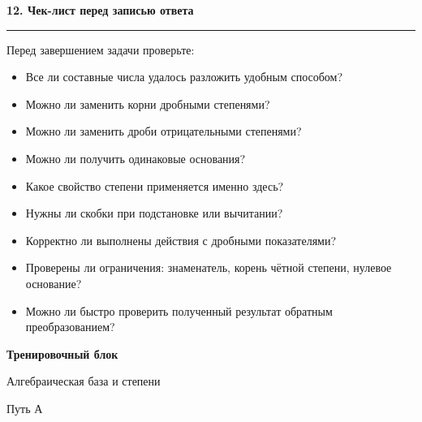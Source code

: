 \documentclass[a4paper,12pt]{article}
\newcommand{\MainSection}[1]{%
  \vspace{0.7em}
  {\Large\bfseries\color{darkaccent}#1\par}
  \vspace{0.25em}
  {\color{accent}\rule{\linewidth}{0.6pt}}
  \vspace{0.5em}
}
\begin{document}

\MainSection{12. Чек-лист перед записью ответа}

Перед завершением задачи проверьте:

\begin{itemize}

\item
Все ли составные числа удалось разложить удобным способом?

\item
Можно ли заменить корни дробными степенями?

\item
Можно ли заменить дроби отрицательными степенями?

\item
Можно ли получить одинаковые основания?

\item
Какое свойство степени применяется именно здесь?

\item
Нужны ли скобки при подстановке или вычитании?

\item
Корректно ли выполнены действия с дробными показателями?

\item
Проверены ли ограничения:
знаменатель, корень чётной степени, нулевое основание?

\item
Можно ли быстро проверить полученный результат обратным преобразованием?

\end{itemize}


\clearpage

\begin{center}
{\LARGE\bfseries\color{darkaccent}
Тренировочный блок
}

\vspace{0.25cm}

{\large
Алгебраическая база и степени
}

\vspace{0.2cm}

{\small\color{softgray}
Путь А
}
\end{center}
\end{document}
